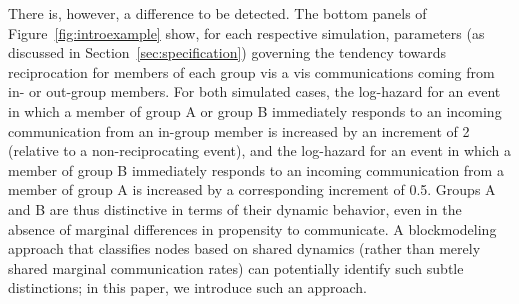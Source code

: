 There is, however, a difference to be detected.  The bottom panels of Figure~\ref{fig:introexample} show, for each respective simulation, parameters (as discussed in Section~\ref{sec:specification}) governing the tendency towards reciprocation for members of each group vis a vis communications coming from in- or out-group members.  For both simulated cases, the log-hazard for an event in which a member of group A or group B immediately responds to an incoming communication from an in-group member is increased by an increment of 2 (relative to a non-reciprocating event), and the log-hazard for an event in which a member of group B immediately responds to an incoming communication from a member of group A is increased by a corresponding increment of 0.5.  Groups A and B are thus distinctive in terms of their dynamic behavior, even in the absence of marginal differences in propensity to communicate.  A blockmodeling approach that classifies nodes based on shared dynamics (rather than merely shared marginal communication rates) can potentially identify such subtle distinctions; in this paper, we introduce such an approach.




